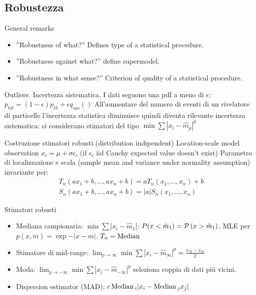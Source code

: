 \documentclass[asd-beamer.tex]{subfiles}
\begin{document}
\subsection{Robustezza}

\begin{frame}{General remarks}
\begin{itemize}
\item ''Robustness of what?'' Defines type of a statistical procedure.
\item ''Robustness against what?'' define supermodel.
\item ''Robustness in what sense?'' Criterion of quality of a statistical procedure.
\end{itemize}
\end{frame}

\begin{frame}{Outliers. Incertezza sistematica.}
I dati seguono una pdf a meno di $\epsilon$: $p_{tot}=(1-\epsilon)p_{th}+\epsilon q_{sys}()$
All'aumentare del numero di eventi di un rivelatore di particelle l'incertezza statistica diminuisce quindi diventa rilevante incertezza sistematica: si considerano stimatori del tipo $\min\sum|x_i-\hat{m}_p|^p$
\begin{block}{Costruzione stimatori robusti (distribution indipendent)}
Location-scale model observation $x_i=\mu+\sigma\epsilon_i$ (if $\epsilon_i$ iid Cauchy expected value doesn't exist)
Parametro di localizzazione e scala (sample mean and variance under normality assumption) invariante per:
\begin{align*}
&T_n(ax_1+b,\ldots,ax_n+b)=aT_n(x_1,\ldots,x_n)+b\\
&S_n(ax_1+b,\ldots,ax_n+b)=|a|S_n(x_1,\ldots,x_n)
\end{align*}
\end{block}
\end{frame}

\begin{frame}{Stimatori robusti}
\begin{itemize}
\item Mediana campionaria: $\min\sum|x_i-\hat{m}_1|$: $P(x<\hat{m}_1)=\operatorname{\mathcal{P}}{(x>\hat{m}_1)}$. MLE per $p(x,m)=\exp{-|x-m|}$. $T_n=\operatorname{Median}{}$
\item Stimatore di mid-range: $\lim_{p\to\infty}\min\sum|x_i-\hat{m}_{\infty}|^p=\frac{x_M-x_m}{2}$
\item Moda:	$\lim_{p\to-\infty}\min\sum|x_i-\hat{m}_{-\infty}|^p$ seleziona coppia di dati pi\'u vicini.
\item Dispersion estimator (MAD): $c\operatorname{Median}{}_i|x_i-\operatorname{Median}{}_jx_j|$
\end{itemize}
\end{frame}
\end{document}
